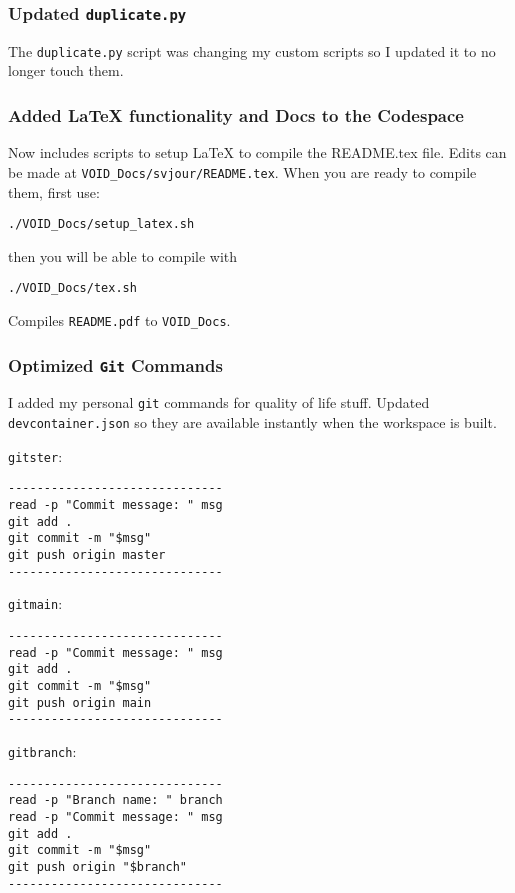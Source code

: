 \documentclass[twocolumn,natbib]{svjour3}        %
\begin{document}
\subsubsection{Updated \texttt{duplicate.py}}
The \texttt{duplicate.py} script was changing my custom scripts so I updated it to no longer touch them.

\subsubsection{Added LaTeX functionality and Docs to the Codespace}
Now includes scripts to setup LaTeX to compile the README.tex file. Edits can be made at \texttt{VOID\_Docs/svjour/README.tex}. When you are ready to compile them, first use:
\begin{lstlisting}
./VOID_Docs/setup_latex.sh
\end{lstlisting}
then you will be able to compile with
\begin{lstlisting}
./VOID_Docs/tex.sh
\end{lstlisting}
Compiles \texttt{README.pdf} to \texttt{VOID\_Docs}.
\subsubsection{Optimized \texttt{Git} Commands}
I added my personal \texttt{git} commands for quality of life stuff. Updated \texttt{devcontainer.json} so they are available instantly when the workspace is built.

\vspace{1em}

\texttt{gitster}:
\begin{verbatim}
------------------------------
read -p "Commit message: " msg
git add .
git commit -m "$msg"
git push origin master
------------------------------
\end{verbatim}

\vspace{1em}

\texttt{gitmain}:
\begin{verbatim}
------------------------------
read -p "Commit message: " msg
git add .
git commit -m "$msg"
git push origin main
------------------------------
\end{verbatim}

\vspace{1em}

\texttt{gitbranch}:
\begin{verbatim}
------------------------------
read -p "Branch name: " branch
read -p "Commit message: " msg
git add .
git commit -m "$msg"
git push origin "$branch"
------------------------------
\end{verbatim}
\end{document}
